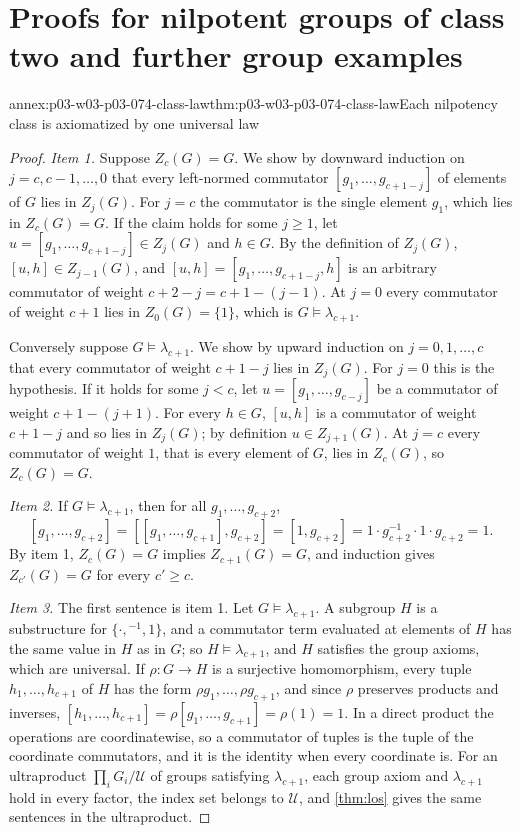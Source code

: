 \section{Proofs for nilpotent groups of class two and further group examples}
\label{sec:annex-p03-w03-p03-074-nilpotent}

\begin{annexitem}{annex:p03-w03-p03-074-class-law}{thm:p03-w03-p03-074-class-law}{Each nilpotency class is axiomatized by one universal law}
\begin{proof}
\emph{Item 1.} Suppose \(Z_c(G)=G\). We show by downward induction on
\(j=c,c-1,\ldots,0\) that every left-normed commutator
\([g_1,\ldots,g_{c+1-j}]\) of elements of \(G\) lies in \(Z_j(G)\). For
\(j=c\) the commutator is the single element \(g_1\), which lies in
\(Z_c(G)=G\). If the claim holds for some \(j\ge1\), let
\(u=[g_1,\ldots,g_{c+1-j}]\in Z_j(G)\) and \(h\in G\). By the definition
of \(Z_j(G)\), \([u,h]\in Z_{j-1}(G)\), and
\([u,h]=[g_1,\ldots,g_{c+1-j},h]\) is an arbitrary commutator of weight
\(c+2-j=c+1-(j-1)\). At \(j=0\) every commutator of weight \(c+1\) lies in
\(Z_0(G)=\{1\}\), which is \(G\models\lambda_{c+1}\).

Conversely suppose \(G\models\lambda_{c+1}\). We show by upward induction
on \(j=0,1,\ldots,c\) that every commutator of weight \(c+1-j\) lies in
\(Z_j(G)\). For \(j=0\) this is the hypothesis. If it holds for some
\(j<c\), let \(u=[g_1,\ldots,g_{c-j}]\) be a commutator of weight
\(c+1-(j+1)\). For every \(h\in G\), \([u,h]\) is a commutator of weight
\(c+1-j\) and so lies in \(Z_j(G)\); by definition \(u\in Z_{j+1}(G)\). At
\(j=c\) every commutator of weight \(1\), that is every element of \(G\),
lies in \(Z_c(G)\), so \(Z_c(G)=G\).

\emph{Item 2.} If \(G\models\lambda_{c+1}\), then for all
\(g_1,\ldots,g_{c+2}\),
\[
 [g_1,\ldots,g_{c+2}]=[[g_1,\ldots,g_{c+1}],g_{c+2}]=[1,g_{c+2}]
 =1\cdot g_{c+2}^{-1}\cdot1\cdot g_{c+2}=1.
\] By item 1, \(Z_c(G)=G\)
implies \(Z_{c+1}(G)=G\), and induction gives \(Z_{c'}(G)=G\) for every
\(c'\ge c\).

\emph{Item 3.} The first sentence is item 1. Let \(G\models\lambda_{c+1}\).
A subgroup \(H\) is a substructure for \(\{\cdot,{}^{-1},1\}\), and a
commutator term evaluated at elements of \(H\) has the same value in \(H\)
as in \(G\); so \(H\models\lambda_{c+1}\), and \(H\) satisfies the group
axioms, which are universal. If \(\rho:G\to H\) is a surjective
homomorphism, every tuple \(h_1,\ldots,h_{c+1}\) of \(H\) has the form
\(\rho g_1,\ldots,\rho g_{c+1}\), and since \(\rho\) preserves products and
inverses,
\([h_1,\ldots,h_{c+1}]=\rho[g_1,\ldots,g_{c+1}]=\rho(1)=1\). In a direct
product the operations are coordinatewise, so a commutator of tuples is the
tuple of the coordinate commutators, and it is the identity when every
coordinate is. For an ultraproduct \(\prod_iG_i/\mathcal U\) of groups
satisfying \(\lambda_{c+1}\), each group axiom and \(\lambda_{c+1}\) hold
in every factor, the index set belongs to \(\mathcal U\), and
\cref{thm:los} gives the same sentences in the ultraproduct.
\end{proof}
\end{annexitem}

